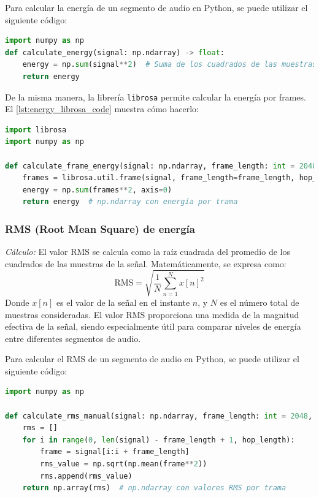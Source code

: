 Para calcular la energía de un segmento de audio en Python, se puede utilizar el siguiente código:
\begin{lstlisting}[language=Python, label={lst:energy_code}, caption={Cálculo de energía en Python}]
import numpy as np
def calculate_energy(signal: np.ndarray) -> float:
    energy = np.sum(signal**2)  # Suma de los cuadrados de las muestras
    return energy
\end{lstlisting}

De la misma manera, la librería \texttt{librosa} \cite{mcfee_librosa_2025} permite calcular la energía por frames. El \autoref{lst:energy_librosa_code} muestra cómo hacerlo:
\begin{lstlisting}[language=Python, label={lst:energy_librosa_code}, caption={Cálculo de energía por tramas utilizando librosa}]
import librosa
import numpy as np

def calculate_frame_energy(signal: np.ndarray, frame_length: int = 2048, hop_length: int = 512) -> np.ndarray:
    frames = librosa.util.frame(signal, frame_length=frame_length, hop_length=hop_length)
    energy = np.sum(frames**2, axis=0)
    return energy  # np.ndarray con energía por trama
\end{lstlisting}

\subsubsection{RMS (Root Mean Square) de energía}

\textit{Cálculo:} El valor RMS se calcula como la raíz cuadrada del promedio de los cuadrados de las muestras de la señal. Matemáticamente, se expresa como:
\[
    \text{RMS} = \sqrt{ \frac{1}{N} \sum_{n=1}^{N} x[n]^2 }
\]
Donde \( x[n] \) es el valor de la señal en el instante \( n \), y \( N \) es el número total de muestras consideradas. El valor RMS proporciona una medida de la magnitud efectiva de la señal, siendo especialmente útil para comparar niveles de energía entre diferentes segmentos de audio.

Para calcular el RMS de un segmento de audio en Python, se puede utilizar el siguiente código:

\begin{lstlisting}[language=Python, label={lst:rms_manual_code}, caption={Cálculo de RMS por tramas sin librosa}]
import numpy as np

def calculate_rms_manual(signal: np.ndarray, frame_length: int = 2048, hop_length: int = 512) -> np.ndarray:
    rms = []
    for i in range(0, len(signal) - frame_length + 1, hop_length):
        frame = signal[i:i + frame_length]
        rms_value = np.sqrt(np.mean(frame**2))
        rms.append(rms_value)
    return np.array(rms)  # np.ndarray con valores RMS por trama
\end{lstlisting}

